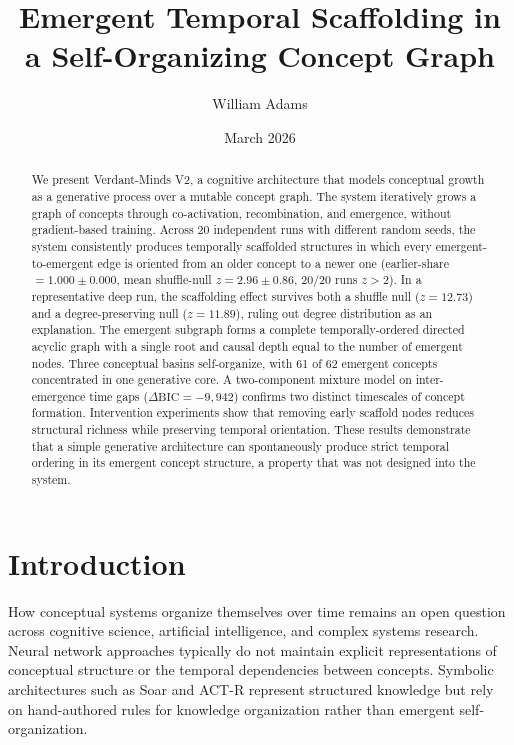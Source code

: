 \documentclass[11pt]{article}
\title{Emergent Temporal Scaffolding in a Self-Organizing Concept Graph}
\author{William Adams}
\date{March 2026}
\begin{document}
\maketitle

\begin{abstract}
We present Verdant-Minds V2, a cognitive architecture that models conceptual growth as a generative process over a mutable concept graph. The system iteratively grows a graph of concepts through co-activation, recombination, and emergence, without gradient-based training. Across 20 independent runs with different random seeds, the system consistently produces temporally scaffolded structures in which every emergent-to-emergent edge is oriented from an older concept to a newer one (earlier-share $= 1.000 \pm 0.000$, mean shuffle-null $z = 2.96 \pm 0.86$, 20/20 runs $z > 2$). In a representative deep run, the scaffolding effect survives both a shuffle null ($z = 12.73$) and a degree-preserving null ($z = 11.89$), ruling out degree distribution as an explanation. The emergent subgraph forms a complete temporally-ordered directed acyclic graph with a single root and causal depth equal to the number of emergent nodes. Three conceptual basins self-organize, with 61 of 62 emergent concepts concentrated in one generative core. A two-component mixture model on inter-emergence time gaps ($\Delta\text{BIC} = -9{,}942$) confirms two distinct timescales of concept formation. Intervention experiments show that removing early scaffold nodes reduces structural richness while preserving temporal orientation. These results demonstrate that a simple generative architecture can spontaneously produce strict temporal ordering in its emergent concept structure, a property that was not designed into the system.
\end{abstract}

\section{Introduction}

How conceptual systems organize themselves over time remains an open question across cognitive science, artificial intelligence, and complex systems research. Neural network approaches typically do not maintain explicit representations of conceptual structure or the temporal dependencies between concepts. Symbolic architectures such as Soar and ACT-R represent structured knowledge but rely on hand-authored rules for knowledge organization rather than emergent self-organization.
\end{document}
